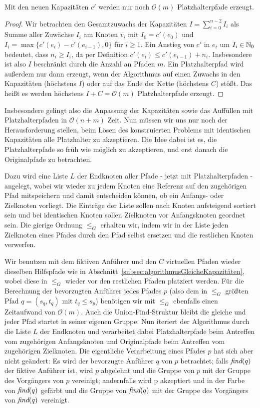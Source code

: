 \begin{lemma}
    Mit den neuen Kapazitäten $c'$ werden nur noch $\mathcal O(m)$ Platzhalterpfade erzeugt.
\end{lemma}
\begin{proof}
    Wir betrachten den Gesamtzuwachs der Kapazitäten $I = \sum_{i = 0}^{n-2} I_i$ als Summe aller Zuwächse $I_i$ am
    Knoten $v_i$ mit $I_0 = c'(e_0)$ und $I_i = \max\{c'(e_i) - c'(e_{i-1}), 0\}$ für $i \geq 1$.
    Ein Anstieg von $c'$ in $e_i$ um $I_i \in \mathbb N_0$ bedeutet, dass $n_i \geq I_i$, da per Definition
    $c'(e_i) \leq c'(e_{i-1}) + n_i$.
    Insbesondere ist also $I$ beschränkt durch die Anzahl an Pfaden $m$.
    Ein Platzhalterpfad wird außerdem nur dann erzeugt, wenn der Algorithmus auf einen Zuwachs in den Kapazitäten (höchstens $I$)
    oder auf das Ende der Kette (höchstens $C$) stößt.
    Das heißt es werden höchstens $I + C = \mathcal O(m)$ Platzhalterpfade erzeugt.
\end{proof}

Insbesondere gelingt also die Anpassung der Kapazitäten sowie das Auffüllen mit Platzhalterpfaden in $\mathcal O(n+m)$ Zeit.
Nun müssen wir uns nur noch der Herausforderung stellen, beim Lösen des konstruierten Problems mit identischen Kapazitäten alle
Platzhalter zu akzeptieren.
Die Idee dabei ist es, die Platzhalterpfade so früh wie möglich zu akzeptieren, und erst danach die Originalpfade zu
betrachten.

Dazu wird eine Liste $L$ der Endknoten aller Pfade - jetzt mit Platzhalterpfaden - angelegt, wobei wir wieder zu jedem Knoten
eine Referenz auf den zugehörigen Pfad mitspeichern und damit entscheiden können, ob ein Anfangs- oder Zielknoten vorliegt.
Die Einträge der Liste sollen nach Knoten aufsteigend sortiert sein und bei identischen Knoten sollen
Zielknoten vor Anfangsknoten geordnet sein.
Die gierige Ordnung $\leq_{G}$ erhalten wir, indem wir in der Liste jeden Zielknoten eines Pfades durch den Pfad selbst
ersetzen und die restlichen Knoten verwerfen.

Wir benutzen mit dem fiktiven Anführer und den $C$ virtuellen Pfaden wieder dieselben Hilfspfade wie in
Abschnitt~\ref{subsec:algorithmusGleicheKapazitäten}, wobei diese in $\leq_G$ wieder vor den restlichen Pfaden platziert werden.
Für die Berechnung der bevorzugten Anführer jedes Pfades $p$ (also dem in $\leq_G$ größten Pfad $q = (s_q, t_q)$ mit
$t_q \leq s_p$) benötigen wir mit $\leq_G$ ebenfalls einen Zeitaufwand von
$\mathcal O(m)$.
Auch die Union-Find-Struktur bleibt die gleiche und jeder Pfad startet in seiner eigenen Gruppe.
Nun iteriert der Algorithmus durch die Liste $L$ der Endknoten und verarbeitet dabei Platzhalterpfade beim Antreffen vom
zugehörigen Anfangsknoten und Originalpfade beim Antreffen vom zugehörigen Zielknoten.
Die eigentliche Verarbeitung eines Pfades $p$ hat sich aber nicht geändert: Es wird der bevorzugte Anführer $q$ von $p$
betrachtet;
falls $\text{\em find}(q)$ der fiktive Anführer ist, wird $p$ abgelehnt und die Gruppe von $p$ mit der
Gruppe des Vorgängers von $p$ vereinigt;
andernfalls wird p akzeptiert und in der Farbe von $\text{\em find}(q)$
gefärbt und die Gruppe von $\text{\em find}(q)$ mit der Gruppe des Vorgängers von $\text{\em find}(q)$ vereinigt.

